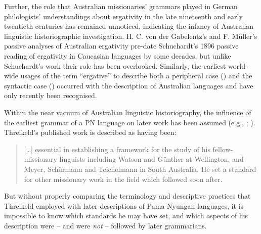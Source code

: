 Further, the role that Australian missionaries’ grammars played in German philologists’ understandings about ergativity in the late nineteenth and early twentieth centuries has remained unnoticed, indicating the infancy of Australian linguistic historiographic investigation. H. C. von der Gabelentz’s and F. Müller’s passive analyses of Australian ergativity \citep{stockigt_early_2015} pre-date Schuchardt’s 1896 passive reading of ergativity in Caucasian languages by some decades, but unlike Schuchardt’s work their role has been overlooked. Similarly, the earliest world-wide usages of the term “ergative” to describe both a peripheral case () and the syntactic case () occurred with the description of Australian languages and have only recently been recognised.

Within the near vacuum of Australian linguistic historiography, the influence of the earliest grammar of a PN language \citep{threlkeld_australian_1834} on later work has been assumed (e.g., \citealt[264--269]{carey_lancelot_2004}; \citealt[91]{simpson_i_2008}). Threlkeld’s published work is described as having been: 

\begin{quote}{}
[…] essential in establishing a framework for the study of his fellow-mis\-sion\-ary linguists including Watson and Günther at Wellington, and Meyer, Schürmann and Teichelmann in South Australia. He set a standard for other missionary work in the field which followed soon after. \citep[269]{carey_lancelot_2004}
\end{quote}

But without properly comparing the terminology and descriptive practices that Threlkeld employed with later descriptions of Pama-Nyungan languages, it is impossible to know which standards he may have set, and which aspects of his description were – and were \textit{not} – followed by later grammarians. 

